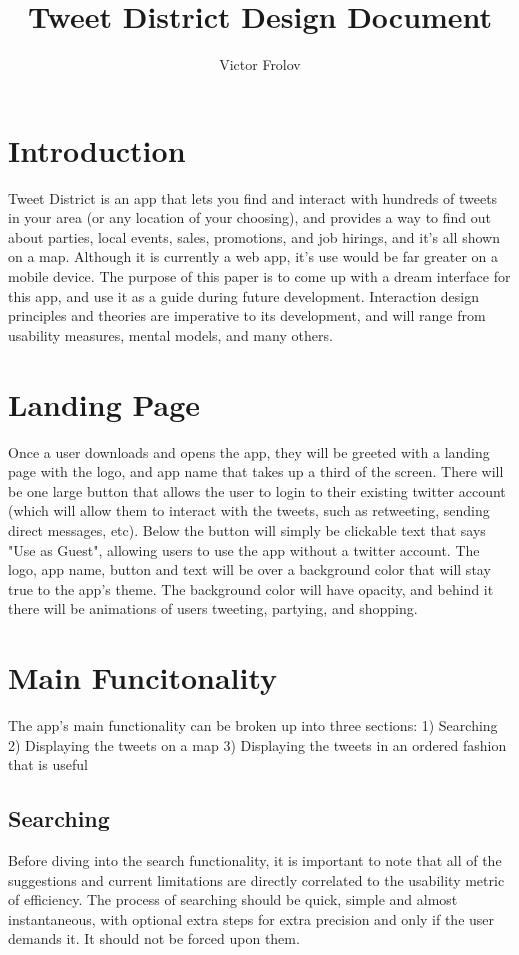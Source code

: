 \documentclass[11pt]{article}
\title{Tweet District Design Document}
\author{Victor Frolov}
\begin{document}
\maketitle

\section{Introduction}
Tweet District is an app that lets you find and interact with hundreds of tweets in your area (or any location of your choosing), and provides a way to find out about parties, local events, sales, promotions, and job hirings, and it's all shown on a map. Although it is currently a web app, it's use would be far greater on a mobile device. The purpose of this paper is to come up with a dream interface for this app, and use it as a guide during future development. Interaction design principles and theories are imperative to its development, and will range from usability measures, mental models, and many others.


\section{Landing Page}
Once a user downloads and opens the app, they will be greeted with a landing page with the logo, and app name that takes up a third of the screen. There will be one large button that allows the user to login to their existing twitter account (which will allow them to interact with the tweets, such as retweeting, sending direct messages, etc). Below the button will simply be clickable text that says "Use as Guest", allowing users to use the app without a twitter account. The logo, app name, button and text will be over a background color that will stay true to the app's theme. The background color will have opacity, and behind it there will be animations of users tweeting, partying, and shopping. 




\section{Main Funcitonality}
The app's main functionality can be broken up into three sections:
1) Searching
2) Displaying the tweets on a map
3) Displaying the tweets in an ordered fashion that is useful

\subsection{Searching}
Before diving into the search functionality, it is important to note that all of the suggestions and current limitations are directly correlated to the usability metric of efficiency. The process of searching should be quick, simple and almost instantaneous, with optional extra steps for extra precision and only if the user demands it. It should not be forced upon them.
\end{document}
